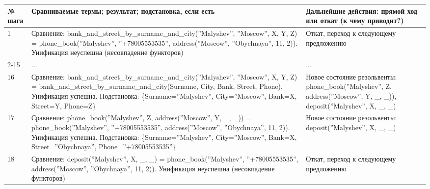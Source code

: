 \documentclass[12pt]{report}
\begin{document}
\begin{table}[H]
	\begin{center}
		\begin{tabular}{|p{1 cm}|p{11 cm}|p{7 cm}|}
			\hline
			№ шага & Сравниваемые термы; результат; подстановка, если есть & Дальнейшие действия: прямой ход или откат (к чему приводит?) \\
			\hline 
			1 & Сравнение: \newline bank\_and\_street\_by\_surname\_and\_city(\newline ''Malyshev'', ''Moscow'', X, Y, Z) = \newline phone\_book(''Malyshev'', ''+78005553535'', address(''Moscow'', ''Obychnaya'', 11, 2)). \newline Унификация неуспешна (несовпадение функторов) & Откат, переход к следующему предложению \\
			\hline
			2-15 & ... & ... \\
			\hline
			16 & Сравнение: \newline bank\_and\_street\_by\_surname\_and\_city(\newline ''Malyshev'', ''Moscow'', X, Y, Z) = \newline bank\_and\_street\_by\_surname\_and\_city(Surname, City, Bank, Street, Phone).  \newline Унификация успешна. \newline Подстановка: \{Surname=''Malyshev'', City=''Moscow'', Bank=X, Street=Y, Phone=Z\} & Новое состояние резольвенты: \newline phone\_book(''Malyshev'', Z, address(''Moscow'', Y, \_, \_)), deposit(''Malyshev'', X, \_, \_) \\
			\hline
			17 & Сравнение: \newline phone\_book(''Malyshev'', Z, address(''Moscow'', Y, \_, \_)) = \newline phone\_book(''Malyshev'', ''+78005553535'', address(''Moscow'', ''Obychnaya'', 11, 2)). \newline Унификация успешна. \newline Подстановка: \{Surname=''Malyshev'', City=''Moscow'', Bank=X, Street=''Obychnaya'', Phone=''+78005553535''\} & Новое состояние резольвенты: \newline deposit(''Malyshev'', X, \_, \_) \\
			\hline
			18 & Сравнение: \newline deposit(''Malyshev'', X, \_, \_) = \newline phone\_book(''Malyshev'', ''+78005553535'', address(''Moscow'', ''Obychnaya'', 11, 2)). \newline Унификация неуспешна (несовпадение функторов) & Откат, переход к следующему предложению \\

\end{tabular}
\end{center}
\end{table}
\end{document}
